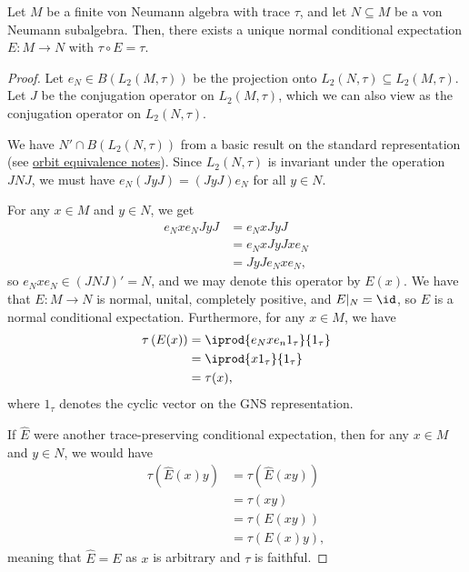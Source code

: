 \documentclass[10pt]{mypackage}
\begin{document}
\begin{theorem}
  Let $M$ be a finite von Neumann algebra with trace $\tau$, and let $N\subseteq M$ be a von Neumann subalgebra. Then, there exists a unique normal conditional expectation $E\colon M\rightarrow N$ with $\tau\circ E = \tau$.
\end{theorem}
\begin{proof}
  Let $e_N\in B\left( L_2\left( M,\tau \right) \right)$ be the projection onto $L_2\left( N,\tau \right)\subseteq L_2\left( M,\tau \right)$. Let $J$ be the conjugation operator on $L_2\left( M,\tau \right)$, which we can also view as the conjugation operator on $L_2\left( N,\tau \right)$.

  We have $N'\cap B\left( L_2\left( N,\tau \right) \right)$ from a basic result on the standard representation (see \href{https://ai-bearing.github.io/Classes_and_Homework/After\%20College/Other\%20Notes/orbit_equivalence.pdf}{orbit equivalence notes}). Since $L_2\left( N,\tau \right)$ is invariant under the operation $JNJ$, we must have $e_N\left( JyJ \right) = \left( JyJ \right)e_N$ for all $y\in N$.

  For any $x\in M$ and $y\in N$, we get
  \begin{align*}
    e_Nxe_NJyJ &= e_NxJyJ\\
               &= e_NxJyJxe_N\\
               &= JyJe_Nxe_N,
  \end{align*}
  so $e_Nxe_N\in \left( JNJ \right)' = N$, and we may denote this operator by $E(x)$. We have that $E\colon M\rightarrow N$ is normal, unital, completely positive, and $E|_{N} = \id$, so $E$ is a normal conditional expectation. Furthermore, for any $x\in M$, we have
  \begin{align*}
    \tau\left( E(x) \right) &= \iprod{e_Nxe_n1_{\tau}}{1_{\tau}}\\
                            &= \iprod{x1_{\tau}}{1_{\tau}}\\
                            &= \tau(x),
  \end{align*}
  where $1_{\tau}$ denotes the cyclic vector on the GNS representation.

  If $\hat{E}$ were another trace-preserving conditional expectation, then for any $x\in M$ and $y\in N$, we would have
  \begin{align*}
    \tau\left( \hat{E}(x)y \right) &=\tau\left( \hat{E}\left( xy \right) \right)\\
                                   &= \tau\left( xy \right)\\
                                   &= \tau\left( E\left( xy \right) \right)\\
                                   &= \tau\left( E(x)y \right),
  \end{align*}
  meaning that $\hat{E} = E$ as $x$ is arbitrary and $\tau$ is faithful.
\end{proof}
\end{document}
